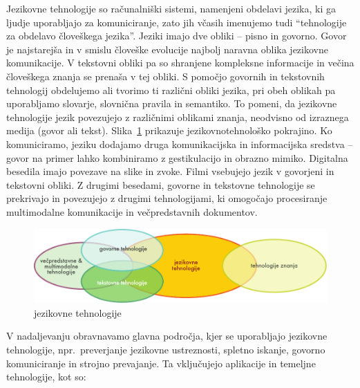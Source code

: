 \begin{multicols}{2}

Jezikovne tehnologije so računalniški sistemi, namenjeni obdelavi jezika, ki ga ljudje uporab\-ljajo za komuniciranje, zato jih včasih imenujemo tudi “tehnologije za obdelavo človeškega jezika”. Jeziki imajo  dve obliki – pisno in go\-vorno. Go\-vor je naj\-starejša in v smislu človeške evolucije naj\-bolj naravna oblika jezikovne komunikacije. V tekstovni obliki pa so shranjene kompleksne informacije in večina človeškega znanja se prenaša v tej obliki. S pomočjo go\-vornih in tekstovnih tehnologij obdelujemo ali tvorimo ti različni obliki jezika, pri obeh oblikah pa uporab\-ljamo slovarje, slovnična pravila in semantiko. To po\-meni, da jezikovne tehnologije jezik povezujejo z različnimi oblikami znanja, neodvisno od izraznega medija (go\-vor ali tekst). Slika~\ref{fig:ltincontext_de} prikazuje jezikovnotehnološko pokrajino. 
%
Ko komuniciramo, jeziku dodajamo druga komunikacij\-ska in informacij\-ska sredstva – go\-vor na primer lahko kombiniramo z gestikulacijo in obrazno mimiko. Digitalna besedila imajo povezave na slike in zvoke. Filmi vsebujejo jezik v go\-vorjeni in tekstovni obliki. Z drugimi besedami, go\-vorne in tekstovne tehnologije se prekrivajo in povezujejo z drugimi tehnologijami, ki omogočajo procesiranje multimodalne komunikacije in večpredstavnih dokumentov.

\begin{figure}[htb]
  \center
  \includegraphics[width=\textwidth]{../_media/slovene/language_technologies}
  \caption{jezikovne tehnologije}
  \label{fig:ltincontext_de}
\end{figure}


V nadaljevanju obravnavamo glavna področja, kjer se uporab\-ljajo jezikovne tehnologije, npr.~preverjanje jezikovne ustreznosti, spletno iskanje, go\-vorno komuniciranje in stroj\-no prevajanje. Ta vključujejo aplikacije in temeljne tehnologije, kot so:


\end{multicols}

